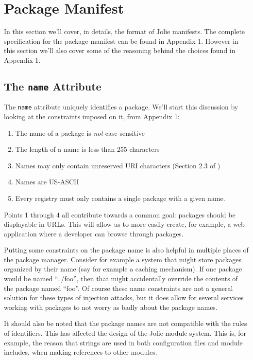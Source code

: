 \section{Package Manifest}

In this section we'll cover, in details, the format of Jolie manifests. The
complete specification for the package manifest can be found in Appendix 1.
However in this section we'll also cover some of the reasoning behind the
choices found in Appendix 1.

\subsection{The {\tt name} Attribute}

The \texttt{name} attribute uniquely identifies a package. We'll
start this discussion by looking at the constraints imposed on it, from
Appendix 1:

\begin{enumerate}
\item
    The name of a package is \emph{not} case-sensitive
\item
    The length of a name is less than 255 characters
\item
    Names may only contain unreserved URI characters (Section 2.3 of
            \autocite{rfc3986})
\item
    Names are US-ASCII
\item
    Every registry must only contains a single package with a given name.
\end{enumerate}

Points 1 through 4 all contribute towards a common goal: packages should be
displayable in URLs. This will allow us to more easily create, for example,
a web application where a developer can browse through packages.

Putting some constraints on the package name is also helpful in multiple places
of the package manager. Consider for example a system that might store packages
organized by their name (say for example a caching mechanism). If one package
would be named ``../foo'', then that might accidentally override the contents
of the package named ``foo''. Of course these name constraints are not a
general solution for these types of injection attacks, but it does allow for
several services working with packages to not worry as badly about the package
names.

It should also be noted that the package names are not compatible with the
rules of identifiers. This has affected the design of the Jolie module system.
This is, for example, the reason that strings are used in both configuration
files and module includes, when making references to other modules.

